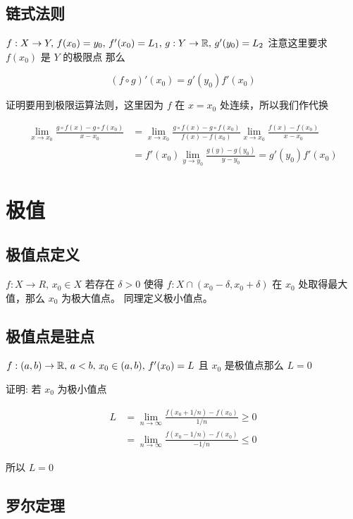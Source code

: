 \subsection{链式法则}

$f: X \to Y,\, f(x_0) = y_0,\, f'(x_0) = L_1,\, g: Y \to \mathbb{R},\, g'(y_0) = L_2$ 注意这里要求 $f(x_0)$ 是 $Y$ 的极限点
那么

\[
(f \circ g)'(x_0) = g'(y_0)f'(x_0)
\]

证明要用到极限运算法则，这里因为 $f$ 在 $x=x_0$ 处连续，所以我们作代换

\begin{align*}
    \lim_{x \to x_0}\frac{g \circ f(x) - g \circ f(x_0)}{x-x_0} &= \lim_{x \to x_0} \frac{g \circ f(x) - g \circ f(x_0)}{f(x) - f(x_0)} \lim_{x \to x_0}\frac{f(x) - f(x_0)}{x-x_0} \\
    &= f'(x_0)\lim_{y \to y_0} \frac{g(y) - g(y_0)}{y - y_0} = g'(y_0)f'(x_0)
\end{align*}

\section{极值}

\subsection{极值点定义}

$f: X \to R,\, x_0 \in X$ 若存在 $\delta > 0$ 使得 $f: X \cap (x_0 -\delta, x_0 + \delta)$ 在 $x_0$ 处取得最大值，那么 $x_0$ 为极大值点。
同理定义极小值点。

\subsection{极值点是驻点}

$f: (a,b) \to \mathbb{R},\, a<b,\, x_0 \in (a,b),\, f'(x_0) = L$ 且 $x_0$ 是极值点那么 $L=0$ 

证明: 若 $x_0$ 为极小值点

\begin{align*}
L &= \lim_{n \to \infty} \frac{f(x_0+1/n) - f(x_0)}{1/n} \ge 0 \\
  &= \lim_{n \to \infty} \frac{f(x_0-1/n) - f(x_0)}{-1/n} \le 0
\end{align*}

所以 $L = 0$


\subsection{罗尔定理}

